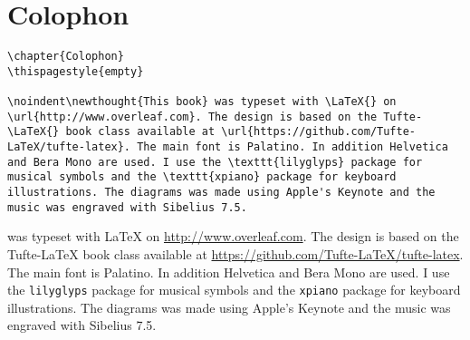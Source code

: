 
\chapter{Colophon}
\thispagestyle{empty}

\begin{fullwidth}

\begin{lstlisting}
\chapter{Colophon} 
\thispagestyle{empty}

\noindent\newthought{This book} was typeset with \LaTeX{} on \url{http://www.overleaf.com}. The design is based on the Tufte-\LaTeX{} book class available at \url{https://github.com/Tufte-LaTeX/tufte-latex}. The main font is Palatino. In addition Helvetica and Bera Mono are used. I use the \texttt{lilyglyps} package for musical symbols and the \texttt{xpiano} package for keyboard illustrations. The diagrams was made using Apple's Keynote and the music was engraved with Sibelius 7.5.

\end{lstlisting}

\noindent{} was typeset with \LaTeX{} on \url{http://www.overleaf.com}. The design is based on the Tufte-\LaTeX{} book class available at \url{https://github.com/Tufte-LaTeX/tufte-latex}. The main font is Palatino. In addition Helvetica and Bera Mono are used. I use the \texttt{lilyglyps} package for musical symbols and the \texttt{xpiano} package for keyboard illustrations. The diagrams was made using Apple's Keynote and the music was engraved with Sibelius 7.5.

\end{fullwidth}


